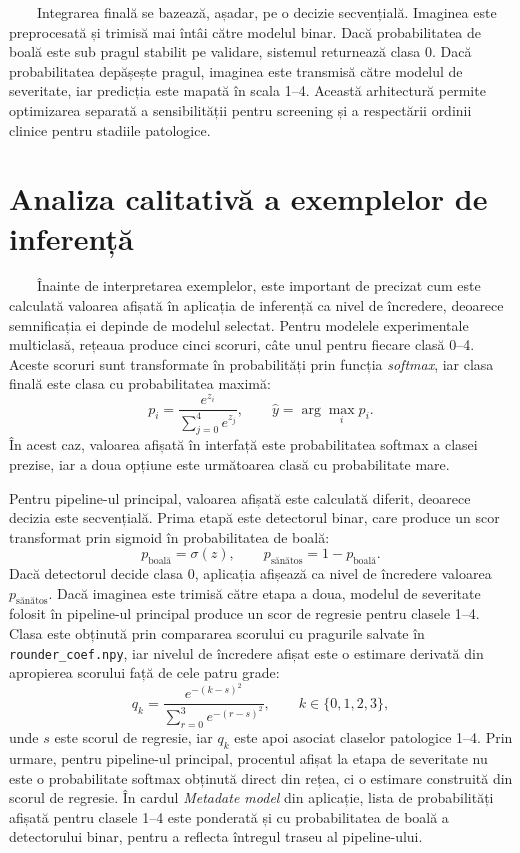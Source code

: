 \documentclass[12pt, a4paper, twoside, romanian]{teza-upb}
\begin{document}
\ \ \ \ Integrarea finală se bazează, așadar, pe o decizie secvențială. Imaginea este preprocesată și
trimisă mai întâi către modelul binar. Dacă probabilitatea de boală este sub pragul stabilit pe
validare, sistemul returnează clasa 0. Dacă probabilitatea depășește pragul, imaginea este transmisă
către modelul de severitate, iar predicția este mapată în scala 1--4. Această arhitectură permite
optimizarea separată a sensibilității pentru screening și a respectării ordinii clinice pentru
stadiile patologice.
\bigskip

\section{Analiza calitativă a exemplelor de inferență}

\ \ \ \ Înainte de interpretarea exemplelor, este important de precizat cum este calculată valoarea afișată
în aplicația de inferență ca nivel de încredere, deoarece semnificația ei depinde de modelul selectat.
Pentru modelele experimentale multiclasă, rețeaua produce cinci scoruri, câte unul pentru fiecare clasă
0--4. Aceste scoruri sunt transformate în probabilități prin funcția \textit{softmax},
iar clasa finală este clasa cu probabilitatea maximă:
\[
p_i = \frac{e^{z_i}}{\sum_{j=0}^{4} e^{z_j}}, \qquad
\hat{y} = \arg\max_i p_i.
\]
În acest caz, valoarea afișată în interfață este probabilitatea softmax a clasei prezise, iar a doua
opțiune este următoarea clasă cu probabilitate mare.
\bigskip

Pentru pipeline-ul principal, valoarea afișată este calculată diferit, deoarece decizia este secvențială.
Prima etapă este detectorul binar, care produce un scor transformat prin sigmoid în probabilitatea de
boală:
\[
p_{\text{boală}} = \sigma(z), \qquad p_{\text{sănătos}} = 1 - p_{\text{boală}}.
\]
Dacă detectorul decide clasa 0, aplicația afișează ca nivel de încredere valoarea
\(p_{\text{sănătos}}\). Dacă imaginea este trimisă către etapa a doua, modelul de severitate folosit în
pipeline-ul principal produce un scor de regresie pentru clasele 1--4. Clasa este obținută prin
compararea scorului cu pragurile salvate în \texttt{rounder\_coef.npy}, iar nivelul de încredere afișat
este o estimare derivată din apropierea scorului față de cele patru grade:
\[
q_k = \frac{e^{-(k-s)^2}}{\sum_{r=0}^{3} e^{-(r-s)^2}}, \qquad k \in \{0,1,2,3\},
\]
unde \(s\) este scorul de regresie, iar \(q_k\) este apoi asociat claselor patologice 1--4. Prin urmare,
pentru pipeline-ul principal, procentul afișat la etapa de severitate nu este o probabilitate softmax
obținută direct din rețea, ci o estimare construită din scorul de regresie. În cardul \textit{Metadate
model} din aplicație, lista de probabilități afișată pentru clasele 1--4 este ponderată și cu
probabilitatea de boală a detectorului binar, pentru a reflecta întregul traseu al pipeline-ului.
\bigskip
\end{document}
